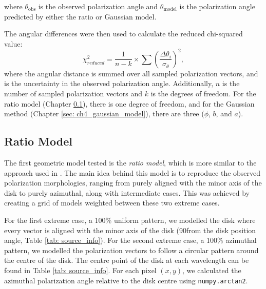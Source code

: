 \noindent where $\theta_{\text{obs}}$ is the observed polarization angle and $\theta_{\text{model}}$ is the polarization angle predicted by either the ratio or Gaussian model. 

The angular differences were then used to calculate the reduced chi-squared value:
\begin{equation}
    \chi^2_{reduced} = \frac{1}{n-k} \times \sum \left(\frac{\Delta \theta_i}{\sigma_\theta}\right)^2,
    \label{eq: chi_sq_reduced}
\end{equation}
\noindent where the angular distance is summed over all sampled polarization vectors, and \PAerr is the uncertainty in the observed polarization angle. Additionally, $n$ is the number of sampled polarization vectors and $k$ is the degrees of freedom. For the ratio model (Chapter \ref{sec: ch4_ratio_model}), there is one degree of freedom, and for the Gaussian method (Chapter \ref{sec: ch4_gaussian_model}), there are three ($\phi$, $b$, and $a$).  



\subsection{Ratio Model}
\label{sec: ch4_ratio_model}
The first geometric model tested is the \emph{ratio model}, which is more similar to the approach used in \cite{Stephens_2017}. The main idea behind this model is to reproduce the observed polarization morphologies, ranging from purely aligned with the minor axis of the disk to purely azimuthal, along with intermediate cases. This was achieved by creating a grid of models weighted between these two extreme cases. 


For the first extreme case, a 100\% uniform pattern, we modelled the disk where every vector is aligned with the minor axis of the disk (90\degg from the disk position angle, Table \ref{tab: source_info}). For the second extreme case, a 100\% azimuthal pattern, we modelled the polarization vectors to follow a circular pattern around the centre of the disk. The centre point of the disk at each wavelength can be found in Table \ref{tab: source_info}. For each pixel $(x, y)$, we calculated the azimuthal polarization angle relative to the disk centre using \texttt{numpy.arctan2}.


